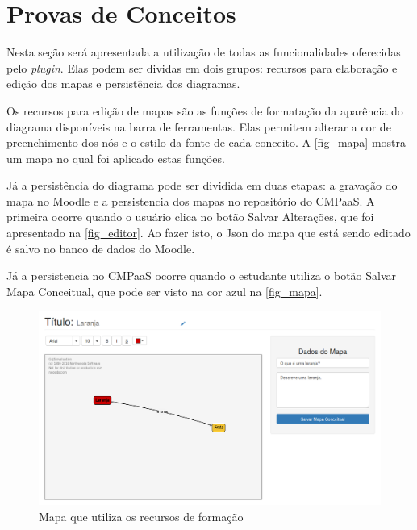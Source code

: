\documentclass[
	12pt,				%
	openright,			%
	oneside,			%
	a4paper,			%
	english,			%
	french,				%
	spanish,			%
	brazil				%
	]{abntex2}
\begin{document}
\section{Provas de Conceitos}

Nesta seção será apresentada a utilização de todas as funcionalidades oferecidas pelo \textit{plugin}. Elas podem ser dividas em dois grupos: recursos para elaboração e edição dos mapas e persistência dos diagramas.

Os recursos para edição de mapas são as funções de formatação da aparência do diagrama disponíveis na barra de ferramentas. Elas permitem alterar a cor de preenchimento dos nós e o estilo da fonte de cada conceito. A \autoref{fig_mapa} mostra um mapa no qual foi aplicado estas funções.

Já a persistência do diagrama pode ser dividida em duas etapas: a gravação do mapa no Moodle e a persistencia dos mapas no repositório do CMPaaS. A primeira ocorre quando o usuário clica no botão Salvar Alterações, que foi apresentado na \autoref{fig_editor}. Ao fazer isto, o Json do mapa que está sendo editado é salvo no banco de dados do Moodle.
 
Já a persistencia no CMPaaS ocorre quando o estudante utiliza o botão Salvar Mapa Conceitual, que pode ser visto na cor azul na \autoref{fig_mapa}.

\begin{figure}[htb]
	\caption{\label{fig_mapa} Mapa que utiliza os recursos de formação}
	\begin{center}
		\includegraphics[scale=0.3]{mapa.png}
	\end{center}
\end{figure}


\end{document}
